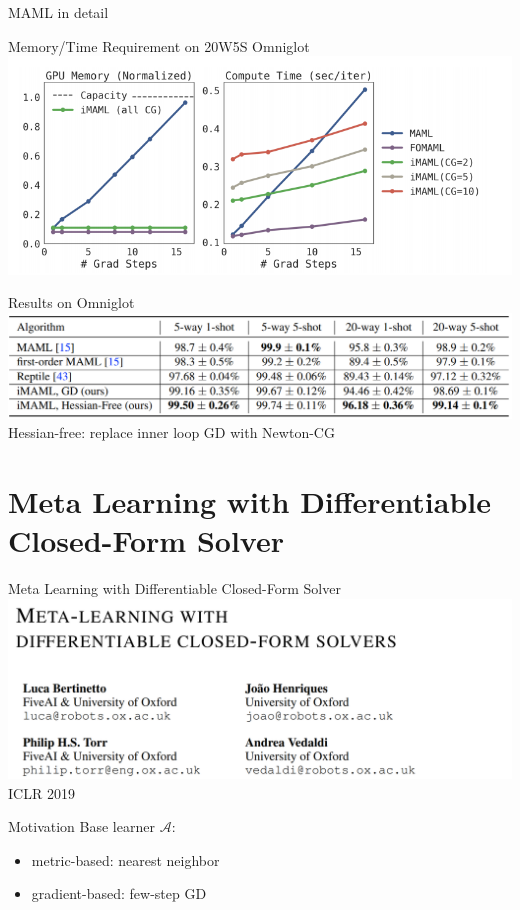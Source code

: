\documentclass{beamer}
\begin{document}
\begin{fraMe}[t]{MAML in detail}
\begin{frame}[t]{Memory/Time Requirement on 20W5S Omniglot}
  \includegraphics[width=\textwidth]{fig/iMAML-mt.png}
\end{frame}


\begin{frame}{Results on Omniglot}
  \includegraphics[width=\textwidth]{fig/iMAML-result.png}
Hessian-free: replace inner loop GD with Newton-CG
\end{frame}

\section{Meta Learning with Differentiable Closed-Form Solver}
\begin{frame}[t]{Meta Learning with Differentiable Closed-Form Solver}
  \includegraphics[width=\textwidth]{fig/r2d2-title.png}
  \center ICLR 2019
\end{frame}

\begin{frame}[t]{Motivation}
  Base learner $\mathcal{A}$:
  \begin{itemize}
    \item metric-based: nearest neighbor
    \item gradient-based: few-step GD
  \end{itemize}


\end{frame}
\end{fraMe}
\end{document}
